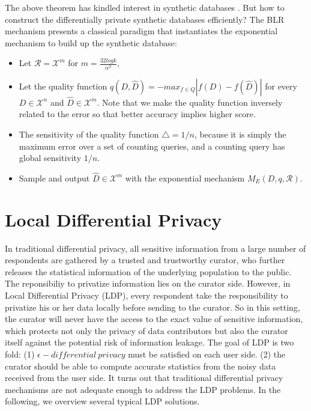 \documentclass[a4paper, 11pt]{article} %
\begin{document}
The above theorem has kindled interest in synthetic databases \cite{blum2013learning, dwork2009complexity}. But how to construct the differentially private synthetic databases efficiently? The BLR mechanism \cite{blum2013learning} presents a classical paradigm that instantiates the exponential mechanism to build up the synthetic database:
\begin{itemize}
\item Let $\mathcal{R} = \mathcal{X}^m$ for $m = \frac{32logk}{\alpha^2},$
\item Let the quality function $q(D, \hat{D}) = -max_{f\in Q} | f(D) - f(\hat{D}) |$ for every $D \in \mathcal{X}^n$ and $\hat{D} \in \mathcal{X}^m$. Note that we make the quality function inversely related to the error so that better accuracy implies higher score.
\item The sensitivity of the quality function $\triangle = 1/n$, because it is simply the maximum error over a set of counting queries, and a counting query  has global sensitivity $1/n$.
\item Sample and output $\hat{D} \in \mathcal{X}^m$ with the exponential mechanism $M_E(D, q, \mathcal{R})$.
\end{itemize}






\section{Local Differential Privacy}
In traditional differential privacy\cite{dwork2008differential}, all sensitive information from a large number of respondents are gathered by a trusted and trustworthy curator, who further releases the statistical information of the underlying population to the public. The reponsibiliy to privatize information lies on the curator side. However, in Local Differential Privacy (LDP)\cite{gupta2013privately,kasiviswanathan2011can}, every respondent take the responsibility to privatize his or her data locally before sending to the curator. So in this setting, the curator will never have the access to the exact value of sensitive information, which protects not only the privacy of data contributors but also the curator itself against the potential risk of information leakage. The goal of LDP is two fold: (1) $\epsilon - differential \ privacy$ must be satisfied on each user side. (2) the curator should be able to compute accurate statistics from the noisy data received from the user side. It turns out that traditional differential privacy mechanisms are not adequate enough to address the LDP problems. In the following, we overview several typical LDP solutions.
\end{document}
